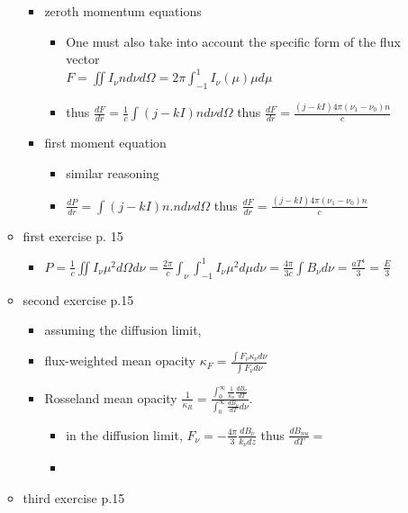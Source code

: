 \documentclass[../main/main.tex]{subfiles}
\begin{document}
\begin{enumerate}
\begin{itemize}
\begin{itemize}
\item zeroth momentum equations
\begin{itemize}
\item One must also take into account the specific form of the flux vector \\ $F = \iint I_{\nu} n d\nu d\Omega = 2 \pi \int_{-1}^1 I_{\nu}(\mu) \mu d \mu$
\item thus $\frac{dF}{dr} = \frac{1}{c} \int (j-kI) n d\nu d\Omega$ thus $\boxed{\frac{dF}{dr} = \frac{(j-kI)4\pi(\nu_1-\nu_0)n}{c}}$
\end{itemize} 

\item first moment equation
\begin{itemize}
\item similar reasoning
\item $\frac{dP}{dr} = \int (j-kI) n.n d\nu d\Omega$ thus $\boxed{\frac{dF}{dr} = \frac{(j-kI)4\pi(\nu_1-\nu_0)n}{c}}$
\end{itemize}
\end{itemize}

\item first exercise p. 15
\begin{itemize}
\item $P = \frac{1}{c}\iint I_{\nu} \mu^2 d\Omega d\nu = \frac{2 \pi}{c} \int_{\nu} \int_{-1}^{1} I_{\nu} \mu^2 d\mu d\nu = \frac{4 \pi}{3c} \int B_{\nu} d\nu = \frac{a T^4}{3} = \frac{E}{3} $
\end{itemize}

\item second exercise p.15 
\begin{itemize}
\item assuming the diffusion limit, 
\item flux-weighted mean opacity $\kappa_F = \frac{\int F_{\nu} \kappa_{\nu}d\nu}{\int F_{\nu} d\nu}$
\item Rosseland mean opacity $\frac{1}{\kappa_R} = \frac{\int_0^{\infty}\frac{1}{\kappa_{\nu}}\frac{dB_{\nu}}{dT}}{\int_0^{\infty} \frac{dB_{\nu}}{dT} d\nu}$. 
\begin{itemize}
\item in the diffusion limit, $F_{\nu} = - \frac{4 \pi}{3}\frac{d B_{\nu}}{k_{\nu} dz}$ thus $\frac{dB_{nu}}{dT} =$
\item  
\end{itemize}
\end{itemize}


\item third exercise p.15


\end{itemize}
\end{enumerate}
\end{document}
